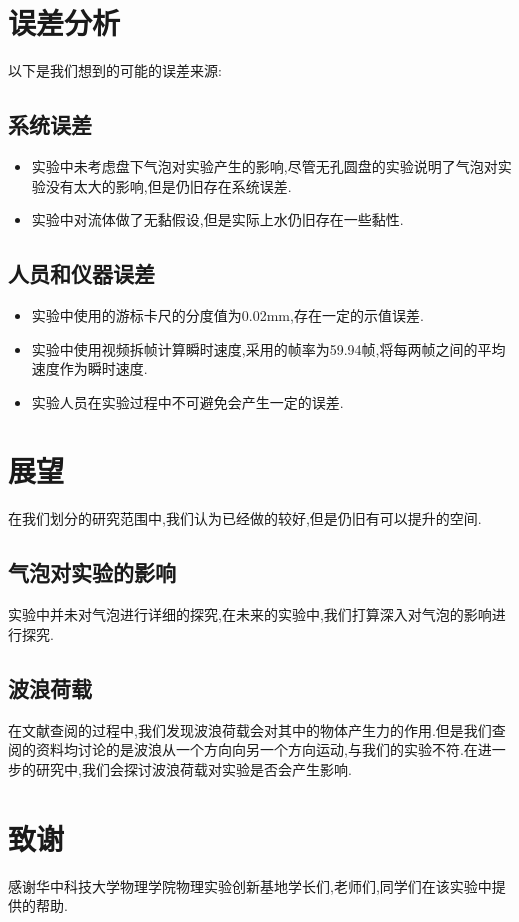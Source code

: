 \documentclass[UTF8]{gapd}
\begin{document}
\section{误差分析}
以下是我们想到的可能的误差来源:
\subsection{系统误差}
\begin{itemize}
    \item 实验中未考虑盘下气泡对实验产生的影响,尽管无孔圆盘的实验说明了气泡对实验没有太大的影响,但是仍旧存在系统误差.
    \item 实验中对流体做了无黏假设,但是实际上水仍旧存在一些黏性.
\end{itemize}
\subsection{人员和仪器误差}
\begin{itemize}
    \item 实验中使用的游标卡尺的分度值为0.02mm,存在一定的示值误差.
    \item 实验中使用视频拆帧计算瞬时速度,采用的帧率为59.94帧,将每两帧之间的平均速度作为瞬时速度.
    \item 实验人员在实验过程中不可避免会产生一定的误差.
\end{itemize}

\section{展望}
在我们划分的研究范围中,我们认为已经做的较好,但是仍旧有可以提升的空间.
\subsection{气泡对实验的影响}
实验中并未对气泡进行详细的探究,在未来的实验中,我们打算深入对气泡的影响进行探究.
\subsection{波浪荷载}
在文献查阅的过程中,我们发现波浪荷载会对其中的物体产生力的作用.但是我们查阅的资料均讨论的是波浪从一个方向向另一个方向运动,与我们的实验不符.在进一步的研究中,我们会探讨波浪荷载对实验是否会产生影响.
\section*{致谢}
感谢华中科技大学物理学院物理实验创新基地学长们,老师们,同学们在该实验中提供的帮助.
\end{document}
